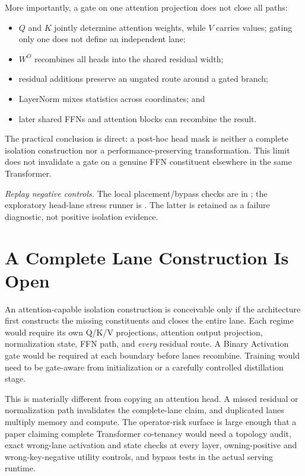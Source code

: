 \documentclass[11pt]{article}
\begin{document}
More importantly, a gate on one attention projection does not close all paths:
\begin{itemize}
  \item $Q$ and $K$ jointly determine attention weights, while $V$ carries
  values; gating only one does not define an independent lane;
  \item $W^O$ recombines all heads into the shared residual width;
  \item residual additions preserve an ungated route around a gated branch;
  \item LayerNorm mixes statistics across coordinates; and
  \item later shared FFNs and attention blocks can recombine the result.
\end{itemize}

The practical conclusion is direct: a post-hoc head mask is neither a complete
isolation construction nor a performance-preserving transformation. This limit
does not invalidate a gate on a genuine FFN constituent elsewhere in the same
Transformer.

\noindent\textit{Replay negative controls.} The local placement/bypass checks
are in ; the exploratory
head-lane stress runner is .
The latter is retained as a failure diagnostic, not positive isolation evidence.

\section{A Complete Lane Construction Is Open}

An attention-capable isolation construction is conceivable only if the
architecture first constructs the missing constituents and closes the entire
lane. Each regime would require its own Q/K/V projections, attention
output projection, normalization state, FFN path, and \emph{every} residual
route. A Binary Activation gate would be required at each boundary before
lanes recombine. Training would need to be gate-aware from initialization or a
carefully controlled distillation stage.

This is materially different from copying an attention head. A missed residual
or normalization path invalidates the complete-lane claim, and duplicated lanes
multiply memory and compute. The operator-risk surface is large enough that a
paper claiming complete Transformer co-tenancy would need a topology audit,
exact wrong-lane activation and state checks at every layer, owning-positive and
wrong-key-negative utility controls, and bypass tests in the actual serving
runtime.
\end{document}
